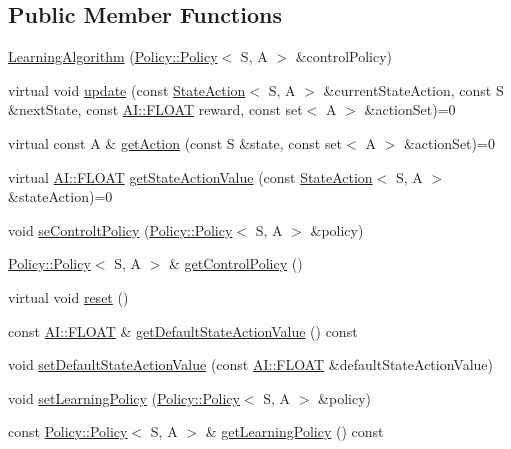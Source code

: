 \subsection*{Public Member Functions}
\begin{DoxyCompactItemize}
\item 
\hyperlink{classAI_1_1Algorithm_1_1LearningAlgorithm_a8fe54228193c0d7a28fba7de00441d7f}{Learning\-Algorithm} (\hyperlink{classAI_1_1Algorithm_1_1Policy_1_1Policy}{Policy\-::\-Policy}$<$ S, A $>$ \&control\-Policy)
\item 
virtual void \hyperlink{classAI_1_1Algorithm_1_1LearningAlgorithm_a7d216d791e558e15a73083af6257ed72}{update} (const \hyperlink{classAI_1_1StateAction}{State\-Action}$<$ S, A $>$ \&current\-State\-Action, const S \&next\-State, const \hyperlink{namespaceAI_a41b74884a20833db653dded3918e05c3}{A\-I\-::\-F\-L\-O\-A\-T} reward, const set$<$ A $>$ \&action\-Set)=0
\item 
virtual const A \& \hyperlink{classAI_1_1Algorithm_1_1LearningAlgorithm_afeca4eded9bc0a02312ccbbfd05f8daa}{get\-Action} (const S \&state, const set$<$ A $>$ \&action\-Set)=0
\item 
virtual \hyperlink{namespaceAI_a41b74884a20833db653dded3918e05c3}{A\-I\-::\-F\-L\-O\-A\-T} \hyperlink{classAI_1_1Algorithm_1_1LearningAlgorithm_a1044b2558109e8dd3d3bf5bedb9723b5}{get\-State\-Action\-Value} (const \hyperlink{classAI_1_1StateAction}{State\-Action}$<$ S, A $>$ \&state\-Action)=0
\item 
void \hyperlink{classAI_1_1Algorithm_1_1LearningAlgorithm_a1d26cb76c945a5312ce4ac4fdabc4d31}{se\-Controlt\-Policy} (\hyperlink{classAI_1_1Algorithm_1_1Policy_1_1Policy}{Policy\-::\-Policy}$<$ S, A $>$ \&policy)
\item 
\hyperlink{classAI_1_1Algorithm_1_1Policy_1_1Policy}{Policy\-::\-Policy}$<$ S, A $>$ \& \hyperlink{classAI_1_1Algorithm_1_1LearningAlgorithm_ab123635bc3d527052051c7f4c37a986c}{get\-Control\-Policy} ()
\item 
virtual void \hyperlink{classAI_1_1Algorithm_1_1LearningAlgorithm_aebe650b79f39ffd46ece7adb44ddaf60}{reset} ()
\item 
const \hyperlink{namespaceAI_a41b74884a20833db653dded3918e05c3}{A\-I\-::\-F\-L\-O\-A\-T} \& \hyperlink{classAI_1_1Algorithm_1_1LearningAlgorithm_aafc85fe7b2ad9331ae41593784321641}{get\-Default\-State\-Action\-Value} () const 
\item 
void \hyperlink{classAI_1_1Algorithm_1_1LearningAlgorithm_a1da99bfa2de96f397a4ef07e53ab5697}{set\-Default\-State\-Action\-Value} (const \hyperlink{namespaceAI_a41b74884a20833db653dded3918e05c3}{A\-I\-::\-F\-L\-O\-A\-T} \&default\-State\-Action\-Value)
\item 
void \hyperlink{classAI_1_1Algorithm_1_1LearningAlgorithm_a826f61675ac11b699c4328c44cccdae5}{set\-Learning\-Policy} (\hyperlink{classAI_1_1Algorithm_1_1Policy_1_1Policy}{Policy\-::\-Policy}$<$ S, A $>$ \&policy)
\item 
const \hyperlink{classAI_1_1Algorithm_1_1Policy_1_1Policy}{Policy\-::\-Policy}$<$ S, A $>$ \& \hyperlink{classAI_1_1Algorithm_1_1LearningAlgorithm_aac506aa1838ba12e2069c098d6faec16}{get\-Learning\-Policy} () const 
\end{DoxyCompactItemize}
